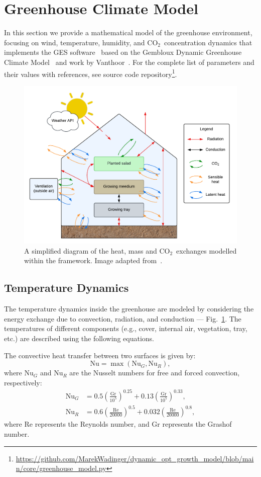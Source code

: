 \documentclass[conference]{IEEEtran}
\newcommand{\coo}{\ensuremath{\mathrm{CO_2}}}
\begin{document}
\section{Greenhouse Climate Model}\label{sec:greenhouse}
In this section we provide a mathematical model of the greenhouse environment, focusing on wind, temperature, humidity, and \coo\ concentration dynamics that implements the GES software~\cite{rmward61_2019} based on the Gembloux Dynamic Greenhouse Climate Model~\cite{GDGCM} and work by Vanthoor~\cite{Vanthoor2011}. For the complete list of parameters and their values with references, see source code repository\footnote{\url{https://github.com/MarekWadinger/dynamic_opt_growth_model/blob/main/core/greenhouse_model.py}}.

\begin{figure}
    \centering
    \includegraphics[width=.5\textwidth]{images/diagram.pdf}
    \caption{A simplified diagram of the heat, mass and \coo\ exchanges modelled within the framework. Image adapted from~\cite{rmward61_2019}.}\label{fig:diagram}
\end{figure}

\subsection{Temperature Dynamics}\label{subsec:temperature}

The temperature dynamics inside the greenhouse are modeled by considering the energy exchange due to convection, radiation, and conduction --- Fig.~\ref{fig:diagram}. The temperatures of different components (e.g., cover, internal air, vegetation, tray, etc.) are described using the following equations.

The convective heat transfer between two surfaces is given by:
\begin{equation}
    \text{Nu} = \max \left( \text{Nu}_G, \text{Nu}_R \right),
\end{equation}
where \(\text{Nu}_G\) and \(\text{Nu}_R\) are the Nusselt numbers for free and forced convection, respectively:
\begin{align}
    \text{Nu}_G & = 0.5  {\left( \frac{\text{Gr}}{10^5} \right)}^{0.25} + 0.13  {\left(\frac{\text{Gr}}{10^5}\right)}^{0.33}, \\
    \text{Nu}_R & = 0.6  {\left(\frac{\text{Re}}{20000}\right)}^{0.5} + 0.032  {\left(\frac{\text{Re}}{20000}\right)}^{0.8},
\end{align}
where Re represents the Reynolds number, and Gr represents the Grashof number.
\end{document}
